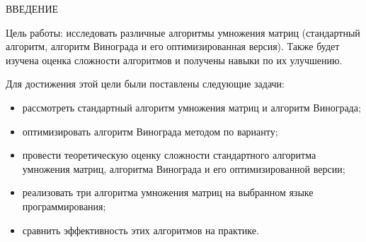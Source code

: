 \begin{center}
    \MakeUppercase{\large Введение}
\end{center}

Цель работы: исследовать различные алгоритмы умножения матриц (стандартный алгоритм, алгоритм Винограда и его оптимизированная версия). Также будет изучена оценка сложности алгоритмов и получены навыки по их улучшению.

\vspace{0.25cm}
Для достижения этой цели были поставлены следующие задачи:

\begin{itemize}

\item рассмотреть стандартный алгоритм умножения матриц и алгоритм Винограда;

\item оптимизировать алгоритм Винограда методом по варианту;

\item провести теоретическую оценку сложности стандартного алгоритма умножения матриц, алгоритма Винограда и его оптимизированной версии;

\item реализовать три алгоритма умножения матриц на выбранном языке программирования;

\item сравнить эффективность этих алгоритмов на практике.

\end{itemize}

\newpage